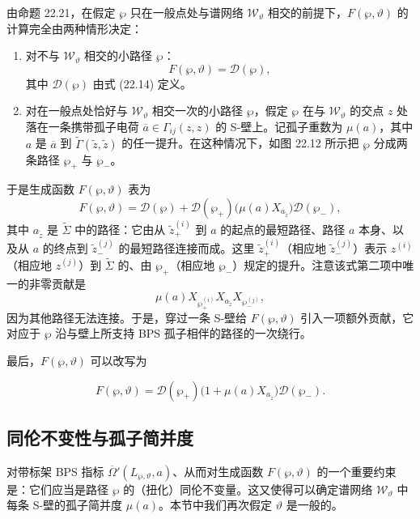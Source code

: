 由命题 22.21，在假定 $\wp$ 只在一般点处与谱网络 $\mathcal{W}_\vartheta$ 相交的前提下，$F(\wp,\vartheta)$ 的计算完全由两种情形决定：
\begin{enumerate}
\item 对不与 $\mathcal{W}_\vartheta$ 相交的小路径 $\wp$：
\begin{equation}
F(\wp,\vartheta)=\mathcal{D}(\wp),\tag{22.15}
\end{equation}
其中 $\mathcal{D}(\wp)$ 由式 (22.14) 定义。
\item 对在一般点处恰好与 $\mathcal{W}_\vartheta$ 相交一次的小路径 $\wp$，假定 $\wp$ 在与 $\mathcal{W}_\vartheta$ 的交点 $z$ 处落在一条携带孤子电荷 $\overline{a}\in\Gamma_{ij}(z,z)$ 的 S-壁上。记孤子重数为 $\mu(a)$，其中 $a$ 是 $\overline{a}$ 到 $\widetilde{\Gamma}(\widetilde{z},\widetilde{z})$ 的任一提升。在这种情况下，如图 22.12 所示把 $\wp$ 分成两条路径 $\wp_+$ 与 $\wp_-$。
\end{enumerate}


于是生成函数 $F(\wp,\vartheta)$ 表为
\[
F(\wp,\vartheta)=\mathcal{D}(\wp)+\mathcal{D}(\wp_+)\big(\mu(a)X_{a_{\widetilde{z}}}\big)\mathcal{D}(\wp_-),
\]
其中 $a_{\widetilde{z}}$ 是 $\widetilde{\Sigma}$ 中的路径：它由从 $\widetilde{z}_+^{(i)}$ 到 $a$ 的起点的最短路径、路径 $a$ 本身、以及从 $a$ 的终点到 $\widetilde{z}_-^{(j)}$ 的最短路径连接而成。这里 $\widetilde{z}_+^{(i)}$（相应地 $\widetilde{z}_-^{(j)}$）表示 $z^{(i)}$（相应地 $z^{(j)}$）到 $\widetilde{\Sigma}$ 的、由 $\wp_+$（相应地 $\wp_-$）规定的提升。注意该式第二项中唯一的非零贡献是
\[
\mu(a)X_{\wp^{(i)}_+}X_{a_{\widetilde{z}}}X_{\wp^{(j)}_-},
\]
因为其他路径无法连接。于是，穿过一条 S-壁给 $F(\wp,\vartheta)$ 引入一项额外贡献，它对应于 $\wp$ 沿与壁上所支持 BPS 孤子相伴的路径的一次绕行。

最后，$F(\wp,\vartheta)$ 可以改写为

\begin{equation}
F(\wp,\vartheta)=\mathcal{D}(\wp_+)\big(1+\mu(a)X_{a_{\widetilde{z}}}\big)\mathcal{D}(\wp_-).\tag{22.16}
\end{equation}

\subsection{同伦不变性与孤子简并度}

对带标架 BPS 指标 $\overline{\Omega}{}'(L_{\wp,\vartheta},a)$、从而对生成函数 $F(\wp,\vartheta)$ 的一个重要约束是：它们应当是路径 $\wp$ 的（扭化）同伦不变量。这又使得可以确定谱网络 $\mathcal{W}_\vartheta$ 中每条 S-壁的孤子简并度 $\mu(a)$。本节中我们再次假定 $\vartheta$ 是一般的。

